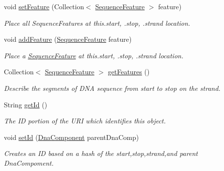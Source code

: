 \begin{DoxyCompactItemize}
\item 
void \hyperlink{classorg_1_1sbolstandard_1_1lib_s_b_o_lj_1_1_sequence_annotation_a1b30c2534562b968dcc3f53f5322ef19}{setFeature} (Collection$<$ \hyperlink{classorg_1_1sbolstandard_1_1lib_s_b_o_lj_1_1_sequence_feature}{SequenceFeature} $>$ feature)
\begin{DoxyCompactList}\small\item\em Place all SequenceFeatures at this.start, .stop, .strand location. \item\end{DoxyCompactList}\item 
void \hyperlink{classorg_1_1sbolstandard_1_1lib_s_b_o_lj_1_1_sequence_annotation_a5510264f89d43dae91ffbae70142c50c}{addFeature} (\hyperlink{classorg_1_1sbolstandard_1_1lib_s_b_o_lj_1_1_sequence_feature}{SequenceFeature} feature)
\begin{DoxyCompactList}\small\item\em Place a \hyperlink{classorg_1_1sbolstandard_1_1lib_s_b_o_lj_1_1_sequence_feature}{SequenceFeature} at this.start, .stop, .strand location. \item\end{DoxyCompactList}\item 
Collection$<$ \hyperlink{classorg_1_1sbolstandard_1_1lib_s_b_o_lj_1_1_sequence_feature}{SequenceFeature} $>$ \hyperlink{classorg_1_1sbolstandard_1_1lib_s_b_o_lj_1_1_sequence_annotation_a44a0df68496920e6dc82a23e4cef573f}{getFeatures} ()
\begin{DoxyCompactList}\small\item\em Describe the segments of DNA sequence from start to stop on the strand. \item\end{DoxyCompactList}\item 
String \hyperlink{classorg_1_1sbolstandard_1_1lib_s_b_o_lj_1_1_sequence_annotation_a352cfd9d26e20377dee9dfe31b217b51}{getId} ()
\begin{DoxyCompactList}\small\item\em The ID portion of the URI which identifies this object. \item\end{DoxyCompactList}\item 
void \hyperlink{classorg_1_1sbolstandard_1_1lib_s_b_o_lj_1_1_sequence_annotation_af9a16828c4c910b0c392f29f368cfd40}{setId} (\hyperlink{classorg_1_1sbolstandard_1_1lib_s_b_o_lj_1_1_dna_component}{DnaComponent} parentDnaComp)
\begin{DoxyCompactList}\small\item\em Creates an ID based on a hash of the start,stop,strand,and parent DnaCompoment. \item\end{DoxyCompactList}\item 

\end{DoxyCompactItemize}

